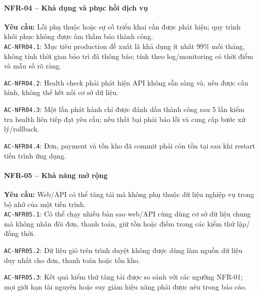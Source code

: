 \paragraph{NFR-04 -- Khả dụng và phục hồi dịch vụ}
\textbf{Yêu cầu:} Lỗi phụ thuộc hoặc sự cố triển khai cần được phát hiện; quy trình khôi phục không được âm thầm báo thành công.\\
\noindent\texttt{AC-NFR04.1}: Mục tiêu production đề xuất là khả dụng ít nhất 99\% mỗi tháng, không tính thời gian bảo trì đã thông báo; tính theo log/monitoring có thời điểm và mẫu số rõ ràng.\par
\noindent\texttt{AC-NFR04.2}: Health check phải phát hiện API không sẵn sàng và, nếu được cấu hình, không thể kết nối cơ sở dữ liệu.\par
\noindent\texttt{AC-NFR04.3}: Một lần phát hành chỉ được đánh dấu thành công sau 5 lần kiểm tra health liên tiếp đạt yêu cầu; nếu thất bại phải báo lỗi và cung cấp bước xử lý/rollback.\par
\noindent\texttt{AC-NFR04.4}: Đơn, payment và tồn kho đã commit phải còn tồn tại sau khi restart tiến trình ứng dụng.\par

\paragraph{NFR-05 -- Khả năng mở rộng}
\textbf{Yêu cầu:} Web/API có thể tăng tải mà không phụ thuộc dữ liệu nghiệp vụ trong bộ nhớ của một tiến trình.\\
\noindent\texttt{AC-NFR05.1}: Có thể chạy nhiều bản sao web/API cùng dùng cơ sở dữ liệu chung mà không nhân đôi đơn, thanh toán, giữ tồn hoặc điểm trong các kiểm thử lặp/đồng thời.\par
\noindent\texttt{AC-NFR05.2}: Dữ liệu giỏ trên trình duyệt không được dùng làm nguồn dữ liệu duy nhất cho đơn, thanh toán hoặc tồn kho.\par
\noindent\texttt{AC-NFR05.3}: Kết quả kiểm thử tăng tải được so sánh với các ngưỡng NFR-01; mọi giới hạn tài nguyên hoặc suy giảm hiệu năng phải được nêu trong báo cáo.\par

